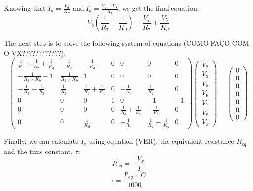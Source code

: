 Knowing that $I_d = \frac{V_d}{K_d}$ and $I_d = \frac{V_7-V_8}{R_7}$, we get the final equation:
\begin{equation}
V_8\left( \frac{1}{R_7} - \frac{1}{K_d}\right) - \frac{V_7}{R_7} + \frac{V_5}{K_d}
\end{equation}


The next step is to solve the following system of equations (COMO FAÇO COM O VX????????????):
\begin{equation}
\left(\begin{array}{ccccccc} \frac{1}{R_1}+\frac{1}{R_2} +\frac{1}{R_3} & -\frac{1}{R_2} & -\frac{1}{R_3} & 0 & 0 & 0&0\\ -\frac{1}{R_2\times K_b}-1 & \frac{1}{R_2\times K_b} & 1 & 0 & 0 & 0 & 0\\ -\frac{1}{R_2}-\frac{1}{R_3} & \frac{1}{R_2} & \frac{1}{R_3}+\frac{1}{R_4} & 0& -\frac{1}{R_7} &\frac{1}{R_7} & 0\\ 0&0&0&1&0&-1&-1\\0&0&0&0&\frac{1}{R_6}+\frac{1}{R_7}&-\frac{1}{R_7}&0 \\ 0&0&\frac{1}{K_d}&0&-\frac{1}{R_7}&\frac{1}{R_7}-\frac{1}{K_d}&0\end{array}\right)
\left(\begin{array}{c} V_2 \\ V_3 \\ V_5 \\ V_6 \\ V_7 \\ V_8 \\ V_x\end{array}\right) 
= \left(\begin{array}{c} 0 \\ 0 \\ 0 \\ 0 \\ 0 \\ 0 \\ 0\end{array}\right)
\end{equation}

Finally, we can calculate $I_x$ using equation (VER), the equivalent resistance $R_{eq}$ and the time constant, $\tau$: 
\begin{equation}
R_{eq}=-\frac{V_x}{I_x}
\end{equation}
\begin{equation}
\tau=\frac{R_{eq}\times C}{1000}
\end{equation}